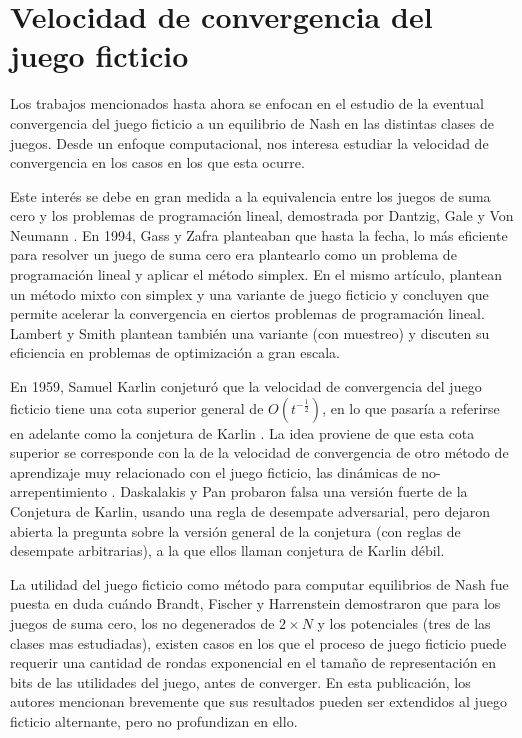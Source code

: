 \section{Velocidad de convergencia del juego ficticio}

Los trabajos mencionados hasta ahora se enfocan en el estudio de la eventual convergencia del juego ficticio a un equilibrio de Nash en las distintas clases de juegos. Desde un enfoque computacional, nos interesa estudiar la velocidad de convergencia en los casos en los que esta ocurre.

Este interés se debe en gran medida a la equivalencia entre los juegos de suma cero y los problemas de programación lineal, demostrada por Dantzig, Gale y Von Neumann \cite{fplp:equiv} \cite{programming:game:equivalence}. En 1994, Gass y Zafra \cite{modified:fp:linear} planteaban que hasta la fecha, lo más eficiente para resolver un juego de suma cero era plantearlo como un problema de programación lineal y aplicar el método simplex. En el mismo artículo, plantean un método mixto con simplex y una variante de juego ficticio y concluyen que permite acelerar la convergencia en ciertos problemas de programación lineal. Lambert y Smith \cite{aproach:large:scale} plantean también una variante (con muestreo) y discuten su eficiencia en problemas de optimización a gran escala.

En 1959, Samuel Karlin conjeturó que la velocidad de convergencia del juego ficticio tiene una cota superior general de $O(t^{-\frac{1}{2}})$, en lo que pasaría a referirse en adelante como la conjetura de Karlin \cite{karlin:conjecture}. La idea proviene de que esta cota superior se corresponde con la de la velocidad de convergencia de otro método de aprendizaje muy relacionado con el juego ficticio, las dinámicas de no-arrepentimiento \cite{no:regret}. Daskalakis y Pan \cite{counter:karlin:strong} probaron falsa una versión fuerte de la Conjetura de Karlin, usando una regla de desempate adversarial, pero dejaron abierta la pregunta sobre la versión general de la conjetura (con reglas de desempate arbitrarias), a la que ellos llaman conjetura de Karlin débil.

La utilidad del juego ficticio como método para computar equilibrios de Nash fue puesta en duda cuándo Brandt, Fischer y Harrenstein \cite{brandt:rate:convergence} demostraron que para los juegos de suma cero, los no degenerados de $2 \times N$ y los potenciales (tres de las clases mas estudiadas), existen casos en los que el proceso de juego ficticio puede requerir una cantidad de rondas exponencial en el tamaño de representación en bits de las utilidades del juego, antes de converger. En esta publicación, los autores mencionan brevemente que sus resultados pueden ser extendidos al juego ficticio alternante, pero no profundizan en ello.